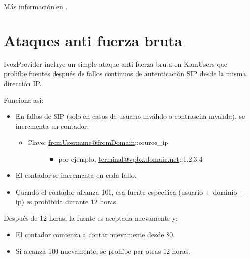 \documentclass[letterpaper,10pt,spanish]{sphinxmanual}
\begin{document}
Más información en {\hyperref[administration_portal/brand/billing/current_day_usages:current\string-day\string-usages]{}}.


\section{Ataques anti fuerza bruta}
\label{security_and_maintenance/security/antibruteforce:anti-brute-force-attacks}\label{security_and_maintenance/security/antibruteforce::doc}\label{security_and_maintenance/security/antibruteforce:id1}
IvozProvider incluye un simple ataque anti fuerza bruta en KamUsers que prohíbe fuentes después de fallos continuos de autenticación SIP desde la misma dirección IP.

Funciona así:
\begin{itemize}
\item {} 
En fallos de SIP (solo en casos de usuario inválido o contraseña inválida), se incrementa un contador:
\begin{itemize}
\item {} \begin{description}
\item[{Clave: \href{mailto:fromUsername@fromDomain}{fromUsername@fromDomain}::source\_ip}] \leavevmode\begin{itemize}
\item {} 
por ejemplo, \href{mailto:terminal@vpbx.domain.net}{terminal@vpbx.domain.net}::1.2.3.4

\end{itemize}

\end{description}

\end{itemize}

\item {} 
El contador se incrementa en cada fallo.

\item {} 
Cuando el contador alcanza 100, esa fuente específica (usuario + dominio + ip) es prohibida durante 12 horas.

\end{itemize}

Después de 12 horas, la fuente es aceptada nuevamente y:
\begin{itemize}
\item {} 
El contador comienza a contar nuevamente desde 80.

\item {} 
Si alcanza 100 nuevamente, se prohíbe por otras 12 horas.

\end{itemize}
\end{document}
